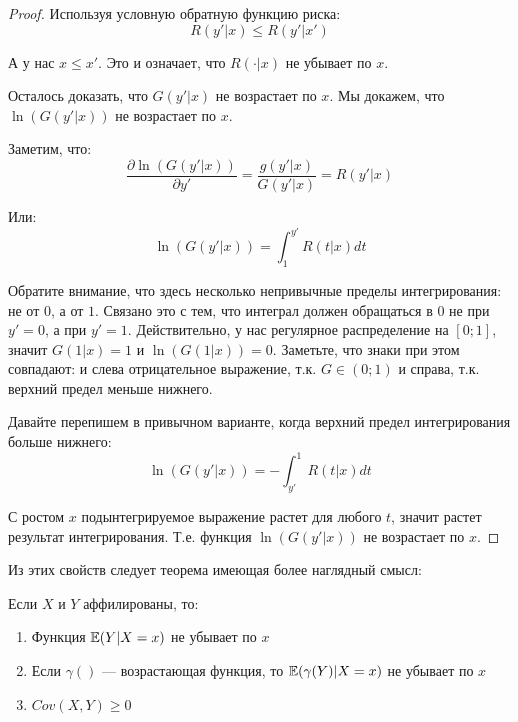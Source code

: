\begin{proof}
Используя условную обратную функцию риска:
\begin{equation}
R(y'|x)\leq R(y'|x')
\end{equation}

А у нас $ x\leq x' $. Это и означает, что $ R(\cdot|x) $ не убывает по $ x $.

Осталось доказать, что $ G(y'|x) $ не возрастает по $ x $. Мы докажем, что $ \ln (G(y'|x)) $ не возрастает по $ x $.

Заметим, что:
\begin{equation}
\frac{\partial \ln (G(y'|x))}{\partial y'}=\frac{g(y'|x)}{G(y'|x)}=R(y'|x)
\end{equation}

Или:
\begin{equation}
\ln(G(y'|x))=\int_{1}^{y'}R(t|x)dt
\end{equation}

Обратите внимание, что здесь несколько непривычные пределы интегрирования: не от $0$, а от $ 1 $. Связано это с тем, что интеграл должен обращаться в 0 не при $ y'=0 $, а при $ y'=1 $. Действительно, у нас регулярное распределение на $ [0;1] $, значит $ G(1|x)=1 $ и $ \ln (G(1|x))=0 $. Заметьте, что знаки при этом совпадают: и слева отрицательное выражение, т.к. $ G\in (0;1) $ и справа, т.к. верхний предел меньше нижнего.

Давайте перепишем в привычном варианте, когда верхний предел интегрирования больше нижнего:
\begin{equation}
\ln(G(y'|x))=-\int_{y'}^{1}R(t|x)dt
\end{equation}

С ростом $ x $ подынтегрируемое выражение растет для любого $ t $, значит растет результат интегрирования. Т.е. функция $\ln( G(y'|x) )$ не возрастает по $ x $.

\end{proof}









Из этих свойств следует теорема имеющая более наглядный смысл:
\begin{myth} \label{prop_affiliated}
Если $ X $ и $ Y $ аффилированы, то:
\begin{enumerate}
\item Функция $ \mathbb{E}(Y|X=x )$ не убывает по $ x $
\item Если $ \gamma() $ --- возрастающая функция, то $ \mathbb{E}(\gamma(Y)|X=x) $ не убывает по $ x $
\item $ Cov(X,Y)\geq 0 $
\end{enumerate}
\end{myth}




